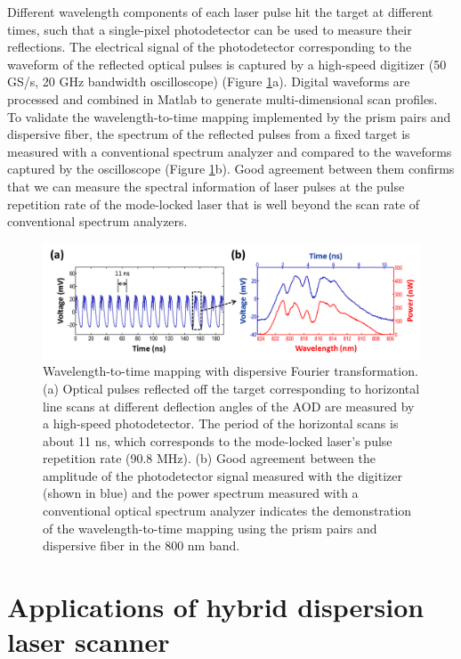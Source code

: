 Different wavelength components of each laser pulse hit the target at different times, such that a single-pixel photodetector can be used to measure their reflections. The electrical signal of the photodetector corresponding to the waveform of the reflected optical pulses is captured by a high-speed digitizer (50 GS/s, 20 GHz bandwidth oscilloscope) (Figure \ref{fig:PW2013_Figure3}a). Digital waveforms are processed and combined in Matlab to generate multi-dimensional scan profiles. To validate the wavelength-to-time mapping implemented by the prism pairs and dispersive fiber, the spectrum of the reflected pulses from a fixed target is measured with a conventional spectrum analyzer and compared to the waveforms captured by the oscilloscope (Figure \ref{fig:PW2013_Figure3}b). Good agreement between them confirms that we can measure the spectral information of laser pulses at the pulse repetition rate of the mode-locked laser that is well beyond the scan rate of conventional spectrum analyzers.

\begin{figure}[htb!]
\centering
\includegraphics[scale=0.65]{PW2013/Figure3.png}
\caption{Wavelength-to-time mapping with dispersive Fourier transformation. (a) Optical pulses reflected off the target corresponding to horizontal line scans at different deflection angles of the AOD are measured by a high-speed photodetector. The period of the horizontal scans is about 11 ns, which corresponds to the mode-locked laser's pulse repetition rate (90.8 MHz). (b) Good agreement between the amplitude of the photodetector signal measured with the digitizer (shown in blue) and the power spectrum measured with a conventional optical spectrum analyzer indicates the demonstration of the wavelength-to-time mapping using the prism pairs and dispersive fiber in the 800 nm band.}
\label{fig:PW2013_Figure3}
\end{figure}

\section{Applications of hybrid dispersion laser scanner}

